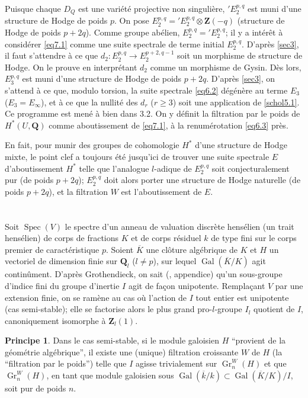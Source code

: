 \documentclass[12pt]{amsart}
\theoremstyle{definition}
\newtheorem{principe}{Principe}[section]
\DeclareMathOperator{\Gr}{Gr}
\DeclareMathOperator{\Spec}{Spec}
\DeclareMathOperator{\Gal}{Gal}
\newcommand{\Q}{\mathbf{Q}}
\newcommand{\Z}{\mathbf{Z}}
\begin{document}
Puisque chaque $D_{Q}$ est une variété projective non singulière, $'\!E_{2}^{p,q}$ est muni d'une structure de Hodge de poids $p$. On pose $E_{2}^{p,q} = {'\!E}_{2}^{p,q} \otimes \Z(-q)$ (structure de Hodge de poids $p+2q$). Comme groupe abélien, $E_{2}^{p,q} = {'\!E}_{2}^{p,q}$; il y a intérêt à considérer \eqref{eq7.1} comme une suite spectrale de terme initial $E_{2}^{p,q}$. D'après \ref{sec3}, il faut s'attendre à ce que $d_{2} : E_{2}^{p,q} \to E_{2}^{p+2,q-1}$ soit un morphisme de structure de Hodge. On le prouve en interprétant $d_{2}$ comme un morphisme de Gysin. Dès lors, $E_{3}^{p,q}$ est muni d'une structure de Hodge de poids $p+2q$. D'après \ref{sec3}, on s'attend à ce que, modulo torsion, la suite spectrale \eqref{eq6.2} dégénère au terme $E_{3}$ ($E_{3} = E_{\infty}$), et à ce que la nullité des $d_{r}$ ($r \geqslant 3$) soit une application de \ref{schol5.1}. Ce programme est mené à bien dans \cite{Hodge2} 3.2. On y définit la filtration par le poids de $H^{*}(U, \Q)$ comme aboutissement de \eqref{eq7.1}, à la renumérotation \eqref{eq6.3} près.

En fait, pour munir des groupes de cohomologie $H^{*}$ d'une structure de Hodge mixte, le point clef a toujours été jusqu'ici de trouver une suite spectrale $E$ d'aboutissement $H^{*}$ telle que l'analogue $l$-adique de $E_{2}^{p,q}$ soit conjecturalement pur (de poids $p+2q$); $E_{2}^{p,q}$ doit alors porter une structure de Hodge naturelle (de poids $p+2q$), et la filtration $W$ est l'aboutissement de $E$.

\section{}\label{sec8}

Soit $\Spec(V)$ le spectre d'un anneau de valuation discrète hensélien (un trait hensélien) de corps de fractions $K$ et de corps résiduel $k$ de type fini sur le corps premier de caractéristique $p$. Soient $\overline{K}$ une clôture algébrique de $K$ et $H$ un vectoriel de dimension finie sur $\Q_{l}$ ($l \neq p$), sur lequel $\Gal(\overline{K}/K)$ agit continûment. D'après Grothendieck, on sait (\cite{Tate}, appendice) qu'un sous-groupe d'indice fini du groupe d'inertie $I$ agit de façon unipotente. Remplaçant $V$ par une extension finie, on se ramène au cas où l'action de $I$ tout entier est unipotente (cas semi-stable); elle se factorise alors le plus grand pro-$l$-groupe $I_{l}$ quotient de $I$, canoniquement isomorphe à $\Z_{l}(1)$.

\begin{principe}\label{princ8.1}
Dans le cas semi-stable, si le module galoisien $H$ ``provient de la géométrie algébrique'', il existe une (unique) filtration croissante $W$ de $H$ (la ``filtration par le poids'') telle que $I$ agisse trivialement sur $\Gr_{n}^{W}(H)$ et que $\Gr_{n}^{W}(H)$, en tant que module galoisien sous $\Gal(\overline{k}/k) \subset \Gal(\overline{K}/K)/I$, soit pur de poids $n$.
\end{principe}
\end{document}
